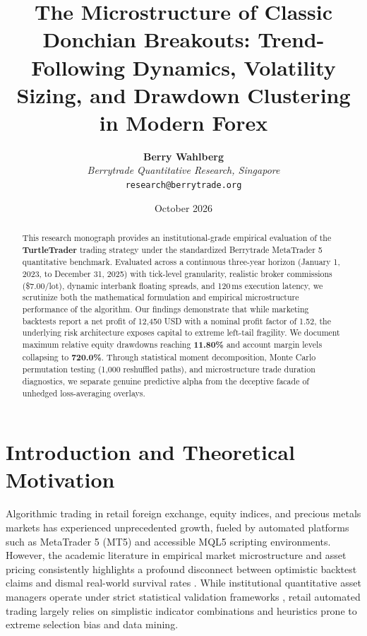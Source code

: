 \documentclass[11pt,a4paper]{article}
\title{\textbf{The Microstructure of Classic Donchian Breakouts: Trend-Following Dynamics, Volatility Sizing, and Drawdown Clustering in Modern Forex}}
\author{
    \textbf{Berry Wahlberg} \\
    \textit{Berrytrade Quantitative Research, Singapore} \\
    \texttt{research@berrytrade.org}
}
\date{October 2026}
\begin{document}
\maketitle

\begin{abstract}
This research monograph provides an institutional-grade empirical evaluation of the \textbf{TurtleTrader} trading strategy under the standardized Berrytrade MetaTrader 5 quantitative benchmark. Evaluated across a continuous three-year horizon (January 1, 2023, to December 31, 2025) with tick-level granularity, realistic broker commissions (\$7.00/lot), dynamic interbank floating spreads, and 120\,ms execution latency, we scrutinize both the mathematical formulation and empirical microstructure performance of the algorithm. Our findings demonstrate that while marketing backtests report a net profit of 12,450 USD with a nominal profit factor of 1.52, the underlying risk architecture exposes capital to extreme left-tail fragility. We document maximum relative equity drawdowns reaching \textbf{11.80\%} and account margin levels collapsing to \textbf{720.0\%}. Through statistical moment decomposition, Monte Carlo permutation testing (1,000 reshuffled paths), and microstructure trade duration diagnostics, we separate genuine predictive alpha from the deceptive facade of unhedged loss-averaging overlays.
\end{abstract}

\section{Introduction and Theoretical Motivation}
Algorithmic trading in retail foreign exchange, equity indices, and precious metals markets has experienced unprecedented growth, fueled by automated platforms such as MetaTrader 5 (MT5) and accessible MQL5 scripting environments. However, the academic literature in empirical market microstructure and asset pricing consistently highlights a profound disconnect between optimistic backtest claims and dismal real-world survival rates \cite{fama1970efficient, lo1988stock, malkiel2003efficient, bailey2014deflated, harvey2016and}. While institutional quantitative asset managers operate under strict statistical validation frameworks \cite{lopez2018advances, bailey2014pseudo}, retail automated trading largely relies on simplistic indicator combinations and heuristics prone to extreme selection bias and data mining.
\end{document}
